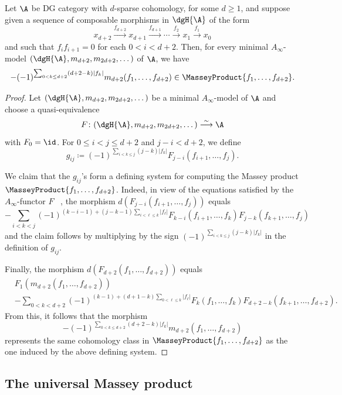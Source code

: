 \documentclass[a4paper]{amsart}
\begin{document}
\begin{proposition}
  \label{prop:MasseyProduct_Ainfty_m}
  Let $\A$ be DG category with $d$-sparse cohomology, for some $d\geq1$, and
  suppose given a sequence of composable morphisms in $\dgH{\A}$ of the form
  \[
    x_{d+2}\xrightarrow{f_{d+2}}x_{d+1}\xrightarrow{f_{d+1}}\cdots\xrightarrow{f_2}x_1\xrightarrow{f_1}x_0
  \]
  and such that $f_if_{i+1}=0$ for each $0<i<d+2$. Then, for every minimal
  $A_\infty$-model $(\dgH{\A},m_{d+2},m_{2d+2},\dots)$ of $\A$, we have
  \[
    -(-1)^{\sum_{0< k\leq
        d+2}(d+2-k)|f_k|}m_{d+2}(f_1,\dots,f_{d+2})\in\MasseyProduct{f_1,\dots,f_{d+2}}.
  \]
\end{proposition}
\begin{proof} 
  Let
  $(\dgH{\A},m_{d+2},m_{2d+2},\dots)$ be a minimal $A_\infty$-model of $\A$ and
  choose a quasi-equivalence
  \[
    F\colon(\dgH{\A},m_{d+2},m_{2d+2},\dots)\stackrel{\sim}{\longrightarrow}\A
  \]
  with $F_0=\id$. For $0\leq i<j\leq d+2$ and $j-i<d+2$, we define
  \[
    g_{ij}\coloneqq (-1)^{\sum_{i<k\leq j}(j-k)|f_k|}F_{j-i}(f_{i+1},\dots,f_j).
  \]

  We claim that the $g_{ij}$'s form a defining system for computing the Massey
  product $\MasseyProduct{f_1,\dots,f_{d+2}}$. Indeed, in view of the equations
  satisfied by the $A_\infty$-functor $F$ ~\cite[Sec.~3.4]{Kel01}, the morphism
  $d(F_{j-i}(f_{i+1},\dots,f_j))$ equals
  \[
    -\sum_{i<k<j}(-1)^{(k-i-1)+(j-k-1)\sum_{i<\ell\leq
        k}|f_{\ell}|}F_{k-i}(f_{i+1},\dots,f_k)F_{j-k}(f_{k+1},\dots,f_j)
  \]
  and the claim follows by multiplying by the sign $(-1)^{\sum_{i<k\leq
      j}(j-k)|f_k|}$ in the definition of $g_{ij}$.

  Finally, the morphism $d(F_{d+2}(f_1,\dots,f_{d+2}))$ equals
  \begin{align*}
    & F_1(m_{d+2}(f_1,\dots,f_{d+2}))                    \\
    & -\sum_{0<k<d+2}(-1)^{(k-1)+(d+1-k)\sum_{0<\ell\leq
      k}|f_{\ell}|}F_k(f_1,\dots,f_k)F_{d+2-k}(f_{k+1},\dots,f_{d+2}).
  \end{align*}
  From this, it follows that the morphism
  \[
    -(-1)^{\sum_{0< k\leq d+2}(d+2-k)|f_k|}m_{d+2}(f_1,\dots,f_{d+2})
  \]
  represents the same cohomology class in $\MasseyProduct{f_1,\dots,f_{d+2}}$ as
  the one induced by the above defining system.
\end{proof}

\subsection{The universal Massey product}
\end{document}
